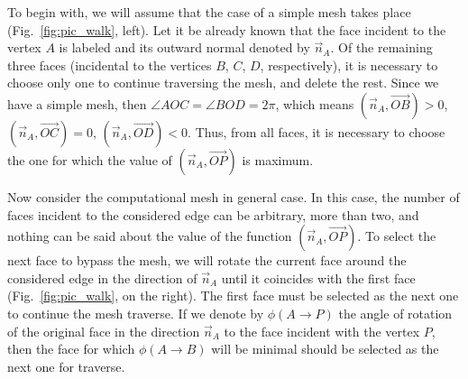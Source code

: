 \documentclass[
11pt,%
tightenlines,%
twoside,%
onecolumn,%
nofloats,%
nobibnotes,%
nofootinbib,%
superscriptaddress,%
noshowpacs,%
centertags]%
{revtex4-2}
\begin{document}
To begin with, we will assume that the case of a simple mesh takes place (Fig.~\ref{fig:pic_walk}, left).
Let it be already known that the face incident to the vertex $A$ is labeled and its outward normal denoted by $\vec{n}_A$.
Of the remaining three faces (incidental to the vertices $B$, $C$, $D$, respectively), it is necessary to choose only one to continue traversing the mesh, and delete the rest.
Since we have a simple mesh, then $\angle AOC = \angle BOD = 2 \pi$, which means $(\vec{n}_A, \vec{OB}) > 0$, $(\vec{n} _A, \vec{OC}) = 0$, $(\vec{n}_A, \vec{OD}) < 0$.
Thus, from all faces, it is necessary to choose the one for which the value of $(\vec{n}_A, \vec{OP})$ is maximum.

Now consider the computational mesh in general case.
In this case, the number of faces incident to the considered edge can be arbitrary, more than two, and nothing can be said about the value of the function $(\vec{n}_A, \vec{OP})$.
To select the next face to bypass the mesh, we will rotate the current face around the considered edge in the direction of $\vec{n}_A$ until it coincides with the first face (Fig.~\ref{fig:pic_walk}, on the right).
The first face must be selected as the next one to continue the mesh traverse.
If we denote by $\phi(A \rightarrow P)$ the angle of rotation of the original face in the direction $\vec{n}_A$ to the face incident with the vertex $P$, then the face for which $\phi(A \rightarrow B)$ will be minimal should be selected as the next one for traverse.
\end{document}
